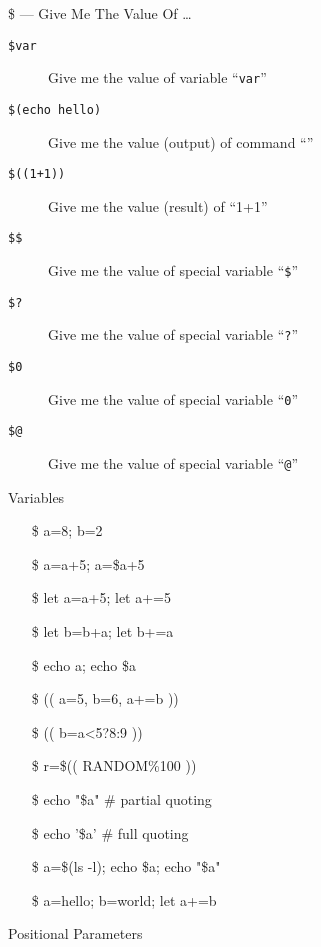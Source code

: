 \begin{frame}{\$ --- Give Me The Value Of \ldots}
  \begin{description}
  \item[\texttt{\$var}] Give me the value of variable ``\texttt{var}''
  \item[\texttt{\$(echo hello)}] Give me the value (output) of command ``''
  \item[\texttt{\$((1+1))}] Give me the value (result) of ``1+1''
  \item[\texttt{\$\$}] Give me the value of special variable ``\texttt{\$}''
  \item[\texttt{\$?}] Give me the value of special variable ``\texttt{?}''
  \item[\texttt{\$0}] Give me the value of special variable ``\texttt{0}''
  \item[\texttt{\$@}] Give me the value of special variable ``\texttt{@}''
  \end{description}
\end{frame}

\begin{frame}{Variables}\ttfamily\small
  \begin{itemize}
  \item[\$] a=8; b=2
  \item[\$] a=a+5; a=\$a+5 \Bad
  \item[\$] let a=a+5; let a+=5 \Good
  \item[\$] let b=b+a; let b+=a \Good
  \item[\$] echo a; echo \$a
  \item[\$] (( a=5, b=6, a+=b )) \Good
  \item[\$] (( b=a<5?8:9 )) \Good
  \item[\$] r=\$(( RANDOM\%100 )) \Good
  \item[\$] echo "\$a" \# partial quoting
  \item[\$] echo '\$a' \# full quoting
  \item[\$] a=\$(ls -l); echo \$a; echo "\$a"
  \item[\$] a=hello; b=world; let a+=b \Bad
  \end{itemize}
\end{frame}

\begin{frame}{Positional Parameters}{}
  \begin{minipage}{.44\linewidth}
    \begin{center}
    \end{center}
  \end{minipage}\quad
  \begin{minipage}{.52\linewidth}
    \begin{center}
    \end{center}
  \end{minipage}
\end{frame}

